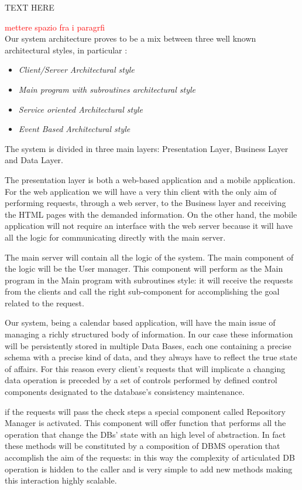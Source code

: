 TEXT HERE


\textcolor{red}{\huge mettere spazio fra i paragrfi}\\
Our system architecture proves to be a mix between three well known architectural styles, in particular : 

\begin{itemize}
\setlength{\leftskip}{0.5cm}
\item \emph{Client/Server Architectural style}
\item \emph{Main program with subroutines architectural style}
\item \emph{Service oriented Architectural style}
\item \emph{Event Based Architectural style}
\end{itemize}

The system is divided in three main layers: Presentation Layer, Business Layer and Data Layer.

The presentation layer is both a web-based application and a mobile application. For the web application we will have a very thin client with the only aim of performing requests, through a web server, to the Business layer and receiving the HTML pages with the demanded information.
On the other hand, the mobile application will not require an interface with the web server because it will have all the logic for communicating directly with the main server.

The main server will contain all the logic of the system. The main component of the logic will be the User manager. This component will perform as the Main program in the Main program with subroutines style: it will receive the requests from the clients and call the right sub-component for accomplishing the goal related to the request.

Our system, being a calendar based application, will have the main issue of managing a richly structured body of information. In our case these information will be persistently stored in multiple Data Bases, each one containing a precise schema with a precise kind of data, and they always have to reflect the true state of affairs. For this reason every client's requests that will implicate a changing data operation is preceded by a set of controls performed by defined control components designated to the database’s consistency maintenance.

if the requests will pass the check steps a special component called Repository Manager is activated. This component will offer function that performs all the operation that change the DBs’ state with an high level of abstraction. In fact these methods will be constituted by a composition of DBMS operation that accomplish the aim of the requests: in this way the complexity of articulated DB operation is hidden to the caller and is very simple to add new methods making this interaction highly scalable.

